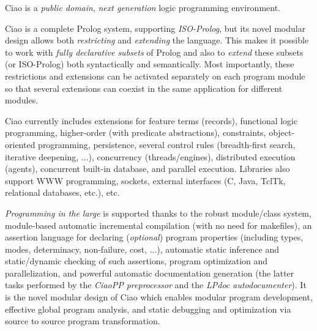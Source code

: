 \documentclass{article}
\newcommand{\ciao}{\psfig{figure=ciao_s.ps}}
\begin{document}
\pagestyle{empty}

\twocolumn[
\hbox{
\ciao~~~~~~~~
\begin{minipage}[b]{0.5\textwidth}
\begin{LARGE}
{\bf Announcing Version 1.6 of the Ciao System}\\[-0.25\baselineskip]
\end{LARGE}
\end{minipage}
}
\vspace{0.5\baselineskip}
]

Ciao is a \emph{public domain}, \emph{next generation} logic
programming environment.

Ciao is a complete Prolog system, supporting \emph{ISO-Prolog}, but
its novel modular design allows both \emph{restricting} and
\emph{extending} the language. This makes it possible to work with
\emph{fully declarative subsets} of Prolog and also to \emph{extend}
these subsets (or ISO-Prolog) both syntactically and semantically.
Most importantly, these restrictions and extensions can be activated
separately on each program module so that several extensions can 
coexist in the same application for different modules.

Ciao currently includes extensions for feature terms (records),
functional logic programming, higher-order (with predicate
abstractions), constraints, object-oriented programming, persistence,
several control rules (breadth-first search, iterative deepening,
...), concurrency (threads/engines), distributed execution (agents),
concurrent built-in database, and parallel execution.  Libraries also
support WWW programming, sockets, external interfaces (C, Java, TclTk,
relational databases, etc.), etc.

\emph{Programming in the large} is supported thanks to the robust
module/class system, module-based automatic incremental compilation
(with no need for makefiles), an assertion language for declaring
(\emph{optional}) program properties (including types, modes,
determinacy, non-failure, cost, ...), automatic static inference and
static/dynamic checking of such assertions, program optimization and
parallelization, and powerful automatic documentation generation (the
latter tasks performed by the \emph{CiaoPP preprocessor} and the
\emph{LPdoc autodocumenter}).  It is the novel modular design of Ciao
which enables modular program development, effective global program
analysis, and static debugging and optimization via source to source
program transformation.
\end{document}
